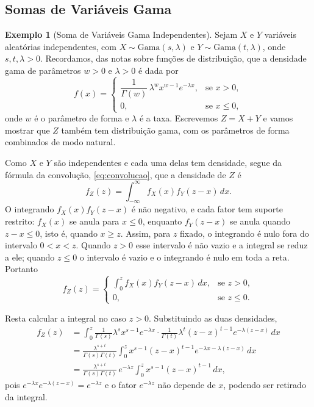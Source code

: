 \documentclass[12pt,portuguese]{article}
\theoremstyle{definition}
\newtheorem{example}[example]{Exemplo}
\theoremstyle{plainexercise}
\theoremstyle{starredexercise}
\theoremstyle{definition}
\begin{document}
\subsection{Somas de Variáveis Gama}\label{subsec:somas-gama}
\begin{example}[Soma de Variáveis Gama Independentes]\label{ex:soma-gamas}
  Sejam $X$ e $Y$ variáveis aleatórias independentes, com
  $X\sim\mathrm{Gama}(s,\lambda)$ e $Y\sim\mathrm{Gama}(t,\lambda)$, onde
  $s,t,\lambda>0$. Recordamos, das notas sobre funções de distribuição, que a
  densidade gama de parâmetros $w>0$ e $\lambda>0$ é dada por
  \[
    f(x) =
    \begin{cases}
      \dfrac{1}{\Gamma(w)}\,\lambda^w x^{w-1} e^{-\lambda x}, & \text{se } x > 0, \\[0.3cm]
      0, & \text{se } x \leqslant 0,
    \end{cases}
  \]
  onde $w$ é o parâmetro de forma e $\lambda$ é a taxa. Escrevemos $Z=X+Y$ e
  vamos mostrar que $Z$ também tem distribuição gama, com os parâmetros de
  forma combinados de modo natural.

  Como $X$ e $Y$ são independentes e cada uma delas tem densidade, segue da
  fórmula da convolução, \eqref{eq:convolucao}, que a densidade de $Z$ é
  \begin{equation}
    f_Z(z) = \int_{-\infty}^{\infty} f_X(x) f_Y(z-x)\,dx.
    \label{eq:t2-convolucao}
  \end{equation}
  O integrando $f_X(x)f_Y(z-x)$ é não negativo, e cada fator tem suporte
  restrito: $f_X(x)$ se anula para $x\leqslant 0$, enquanto $f_Y(z-x)$ se
  anula quando $z-x\leqslant 0$, isto é, quando $x\geqslant z$. Assim, para
  $z$ fixado, o integrando é nulo fora do intervalo $0<x<z$. Quando
  $z>0$ esse intervalo é não vazio e a integral se reduz a ele; quando
  $z\leqslant 0$ o intervalo é vazio e o integrando é nulo em toda a reta.
  Portanto
  \[
    f_Z(z) =
    \begin{cases}
      \displaystyle\int_0^z f_X(x) f_Y(z-x)\,dx, & \text{se } z > 0, \\[0.3cm]
      0, & \text{se } z \leqslant 0.
    \end{cases}
  \]

  Resta calcular a integral no caso $z>0$. Substituindo as duas densidades,
  \begin{align*}
    f_Z(z)
    &= \int_0^z \frac{1}{\Gamma(s)}\lambda^s x^{s-1} e^{-\lambda x}
       \cdot \frac{1}{\Gamma(t)}\lambda^t (z-x)^{t-1} e^{-\lambda(z-x)}\,dx
    \\[0.3cm]
    &= \frac{\lambda^{s+t}}{\Gamma(s)\Gamma(t)}
       \int_0^z x^{s-1}(z-x)^{t-1} e^{-\lambda x - \lambda(z-x)}\,dx
    \\[0.3cm]
    &= \frac{\lambda^{s+t}}{\Gamma(s)\Gamma(t)}\, e^{-\lambda z}
       \int_0^z x^{s-1}(z-x)^{t-1}\,dx,
  \end{align*}
  pois $e^{-\lambda x}e^{-\lambda(z-x)}=e^{-\lambda z}$ e o fator
  $e^{-\lambda z}$ não depende de $x$, podendo ser retirado da integral.


\end{example}
\end{document}
